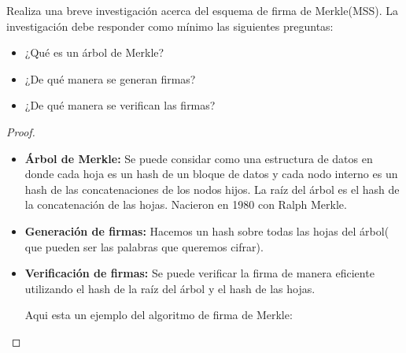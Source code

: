 \begin{Pro}
    Realiza una breve investigación acerca del esquema de firma de Merkle(MSS). La investigación debe 
    responder como mínimo las siguientes preguntas:
    \begin{itemize}
        \item ¿Qué es un árbol de Merkle?
        \item ¿De qué manera se generan firmas? 
        \item ¿De qué manera se verifican las firmas? 
    \end{itemize}
\end{Pro}

\begin{proof}
    \hspace{5mm}
    \begin{itemize}
        \item \textbf{Árbol de Merkle:} Se puede considar como una estructura de datos 
        en donde cada hoja es un hash de un bloque de datos y cada nodo interno es un hash de las concatenaciones
        de los nodos hijos. La raíz del árbol es el hash de la concatenación de las hojas. Nacieron en 1980 con Ralph Merkle.

        \item \textbf{Generación de firmas:} Hacemos un hash sobre todas las hojas del árbol( que pueden ser las palabras que queremos cifrar). 
        \item \textbf{Verificación de firmas:} Se puede verificar la firma de manera eficiente utilizando el hash de la raíz del árbol y el hash de las hojas.
        
        Aqui esta un ejemplo del algoritmo de firma de Merkle:
        
        
        
    \end{itemize}
\end{proof}
